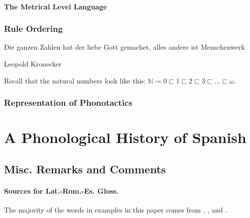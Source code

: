 \documentclass{report}[12pt]
\begin{document}
\subsection{The Metrical Level Language}

\section{Rule Ordering}

\epigraph{Die ganzen Zahlen hat der liebe Gott gemachet, alles andere ist Menschenwerk}{Leopold Kronecker}

Recall that the natural numbers look like this: $\mathbb{N} \coloneq 0 \sqsubset 1 \sqsubset 2 \sqsubset 3 \sqsubset \dots \sqsubset \omega$.

\section{Representation of Phonotactics}

\part{A Phonological History of Spanish}

\chapter{Misc. Remarks and Comments}

\subsection*{Sources for Lat.-Rom.-Es. Gloss.}

The majority of the words in examples in this paper comes from \cite{romance_his}, \cite{lloyd_spanish}, and \cite{penny_spanish}. 

\pagebreak
\end{document}
